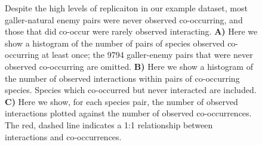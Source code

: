 \documentclass[12pt]{article}
\begin{document}
  \begin{figure}[h!]
      \caption{Despite the high levels of replicaiton in our example dataset, most galler-natural enemy pairs were never observed co-occurring, and those that did co-occur were rarely observed interacting. \textbf{A)} Here we show a histogram of the number of pairs of species observed co-occurring at least once; the 9794 galler-enemy pairs that were never observed co-occurring are omitted.
      \textbf{B)} Here we show a histogram of the number of observed interactions within pairs of co-occurring species. Species which co-occurred but never interacted are included. 
      \textbf{C)} Here we show, for each species pair, the number of observed interactions plotted against the number of observed co-occurrences. The red, dashed line indicates a 1:1 relationship between interactions and co-occurrences.}
      \label{histograms}
      \begin{center}

\end{center}
\end{figure}
\end{document}
